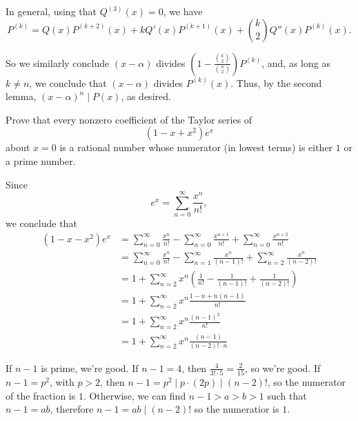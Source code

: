 \begin{sol}
	In general, using that \(Q^{(3)}(x) = 0\), we have \[
		P^{(k)} = Q(x)P^{(k+2)}(x) + kQ'(x)P^{(k+1)}(x) + \binom{k}{2}Q''(x)P^{(k)}(x).
	\]

	So we similarly conclude \((x-\alpha)\) divides \(\left(1 - \frac{\binom{k}{2}}{\binom{n}{2}}\right)P^{(k)}\), and, as long as \(k \neq n\), we conclude that \((x-\alpha)\) divides \(P^{(k)}(x)\). Thus, by the second lemma, \((x-\alpha)^n \mid P(x)\), as desired.
\end{sol}

\newpage
\begin{prob}[Putnam 2014, A1]
	Prove that every nonzero coefficient of the Taylor series of \[
		(1 - x + x^2)e^x
	\] about $x=0$ is a rational number whose numerator (in lowest terms) is either $1$ or a prime number.
\end{prob}

\begin{sol}
	Since \[
		e^x = \sum_{n=0}^\infty \frac{x^n}{n!},
	\]
	we conclude that
	\begin{align*}
		(1 - x - x^2)e^x &= \sum_{n=0}^\infty \frac{x^n}{n!} - \sum_{n=0}^\infty \frac{x^{n+1}}{n!} +  \sum_{n=0}^\infty \frac{x^{n+2}}{n!} \\
		&= \sum_{n=0}^\infty \frac{x^n}{n!} - \sum_{n=1}^\infty \frac{x^{n}}{(n-1)!} +  \sum_{n=2}^\infty \frac{x^{n}}{(n-2)!} \\
		&= 1 + \sum_{n=2}^\infty x^n\left( \frac{1}{n!} - \frac{1}{(n-1)!} + \frac{1}{(n-2)!} \right) \\
		&= 1 + \sum_{n=2}^\infty x^n \frac{1 - n + n(n-1)}{n!} \\
		&= 1 + \sum_{n=2}^\infty x^n \frac{(n-1)^2}{n!}\\
		&= 1 + \sum_{n=2}^\infty x^n \frac{(n-1)}{(n-2)! \cdot n}
	\end{align*}

	If \(n - 1\) is prime, we're good. If \(n - 1 = 4\), then \(\frac{4}{3!\cdot5} = \frac{2}{15}\), so we're good. If \(n - 1 = p^2\), with \(p > 2\), then \(n-1 = p^2 \mid p \cdot (2p) \mid (n-2)!\), so the numerator of the fraction is \(1\). Otherwise, we can find \(n - 1 > a > b > 1\) such that  \(n - 1 = ab\), therefore  \(n-1 = ab \mid (n-2)!\) so the numeratior is \(1\).
\end{sol}
